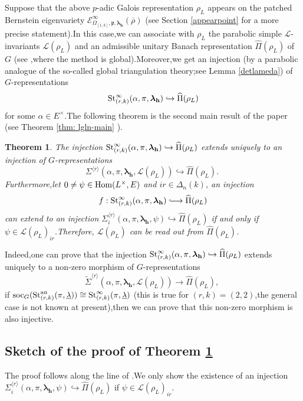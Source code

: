 \documentclass[SecEq,CM,GP]{degruyter-crelle} %
\theoremstyle{plain}
\newtheorem{thm}{Theorem}[section]
\newcommand{\hooklongrightarrow}{\lhook\joinrel\longrightarrow}
\newcommand{\ana}{{\rm an}}
\newcommand{\bersteineigenvarpik}{{\mathcal{E}_{\omepik,\fp,\bm{\lambda}_\bh}^\infty(\overline{\rho})}}
\newcommand{\homo}{{\rm Hom}}
\newcommand{\lrr}{{\langle r\rangle}}
\newcommand{\omepik}{\Omega_{[1,k]}}
\newcommand{\st}{{\rm St}}
\newcommand{\soc}{{\rm soc}}
\newcommand{\bh}{{\mathbf{h}}}
\newcommand{\fp}{{\mathfrak{p}}}
\newcommand{\sL}{\mathcal L}
\begin{document}
Suppose that the above $p$-adic Galois representation $\rho_L$ appears on the  patched Bernstein eigenvariety $\bersteineigenvarpik$ (see Section \ref{appearpoint} for a more precise statement).\;In this case,\;we can associate with $\rho_L$ the  parabolic simple $\sL$-invariants $\sL(\rho_L)$ and  an admissible unitary Banach representation $\widehat{\Pi}(\rho_L)$ of $G$ (see \cite{PATCHING2016},\;where the method is global).\;Moreover,\;we get an injection (by a parabolic analogue of the so-called global triangulation theory;\;see Lemma \ref{detlameda}) of $G$-representations
\[\st_{(r,k)}^{\infty}(\alpha,\pi,{\bm\lambda}_\bh)\hookrightarrow \widehat{\Pi}(\rho_L)\]
for some $\alpha\in E^\times$.\;The following theorem is the second main result of the paper (see Theorem \ref{thm: lgln-main} ).
\begin{thm}\label{introthm: lgln-main}The injection $\st_{(r,k)}^{\infty}(\alpha,\pi,{\bm\lambda}_\bh)\hookrightarrow \widehat{\Pi}(\rho_L)$ extends uniquely to an injection of $G$-representations
	\[\Sigma^{\lrr}(\alpha,\pi,{\bm\lambda}_\bh, \sL(\rho_L))\hookrightarrow \widehat{\Pi}(\rho_L).\;\]
	Furthermore,\;let $0\neq \psi\in \homo(L^{\times},E)$ and $ir\in \Delta_n(k)$, an injection
	\begin{equation*}
		f: \st_{(r,k)}^{\infty}(\alpha,\pi,{\bm\lambda}_\bh)\hooklongrightarrow \widehat{\Pi}(\rho_L)   \end{equation*}
	can extend to an injection $\Sigma_{i}^{\lrr}(\alpha, \pi,{\bm\lambda}_\bh, \psi)\hookrightarrow \widehat{\Pi}(\rho_L)$ if and only if $\psi\in \sL(\rho_L)_{ir}$.\;Therefore, $\sL(\rho_L)$ can be read out from $\widehat{\Pi}(\rho_L)$.\;
\end{thm}
Indeed,\;one can prove that the injection $\st_{(r,k)}^{\infty}(\alpha,\pi,{\bm\lambda}_\bh)\hookrightarrow \widehat{\Pi}(\rho_L)$ extends uniquely to a non-zero morphism of $G$-representations
\[\widetilde{\Sigma}^{\lrr}(\alpha,\pi,{\bm\lambda}_\bh, \sL(\rho_L))\rightarrow \widehat{\Pi}(\rho_L),\;\]
if $\soc_G(\mathrm{St}_{(r,k)}^{\ana}(\pi,\underline{\lambda}))\cong \mathrm{St}_{(r,k)}^{\infty}(\pi,\underline{\lambda})$ (this is true for $(r,k)=(2,2)$,\;the general case is not known at present),\;then we can prove that this non-zero morphism is also injective.\;

\subsection{Sketch of the proof of Theorem \ref{introthm: lgln-main}}
The proof  follows along the line of \cite[Page 7996-7997]{2019DINGSimple}.\;We only show the existence of an injection $\Sigma_{i}^{\lrr}(\alpha, \pi,{\bm\lambda}_\bh, \psi)\hookrightarrow \widehat{\Pi}(\rho_L)$ if $\psi\in \sL(\rho_L)_{ir}$.\;
\end{document}
